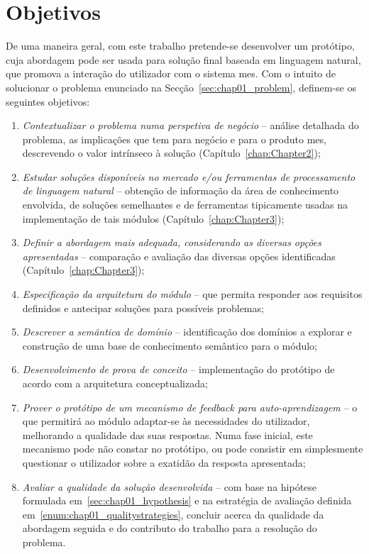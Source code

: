 \section{Objetivos}
\label{sec:chap01_objectives}
De uma maneira geral, com este trabalho pretende-se desenvolver um protótipo, cuja abordagem pode ser usada para solução final baseada em linguagem natural, que promova a interação do utilizador com o sistema \gls{mes}. Com o intuito de solucionar o problema enunciado na Secção~\ref{sec:chap01_problem}, definem-se os seguintes objetivos:

\begin{enumerate}
    \item
    {
        \textit{Contextualizar o problema numa perspetiva de negócio} -- análise detalhada do problema, as implicações que tem para negócio e para o produto \gls{mes}, descrevendo o valor intrínseco à solução (Capítulo~\ref{chap:Chapter2});
    }
    \item
    {
        \textit{Estudar soluções disponíveis no mercado e/ou ferramentas de processamento de linguagem natural} -- obtenção de informação da área de conhecimento envolvida, de soluções semelhantes e de ferramentas tipicamente usadas na implementação de tais módulos (Capítulo~\ref{chap:Chapter3});
    }
    \item
    {
        \textit{Definir a abordagem mais adequada, considerando as diversas opções apresentadas} -- comparação e avaliação das diversas opções identificadas (Capítulo~\ref{chap:Chapter3});
    }
    \item
    {
        \textit{Especificação da arquitetura do módulo} -- que permita responder aos requisitos definidos e antecipar soluções para possíveis problemas;
    }
    \item
    {
        \textit{Descrever a semântica de domínio} -- identificação dos domínios a explorar e construção de uma base de conhecimento semântico para o módulo;
    }
    \item
    {
        \textit{Desenvolvimento de prova de conceito} -- implementação do protótipo de acordo com a arquitetura conceptualizada;
    }
    \item
    {
        \textit{Prover o protótipo de um mecanismo de feedback para auto-aprendizagem} -- o que permitirá ao módulo adaptar-se às necessidades do utilizador, melhorando a qualidade das suas respostas. Numa fase inicial, este mecanismo pode não constar no protótipo, ou pode consistir em simplesmente questionar o utilizador sobre a exatidão da resposta apresentada;
    }
    \item
    {
        \textit{Avaliar a qualidade da solução desenvolvida} -- com base na hipótese formulada em~\ref{sec:chap01_hypothesis} e na estratégia de avaliação definida em~\ref{enum:chap01_qualitystrategies}, concluir acerca da qualidade da abordagem seguida e do contributo do trabalho para a resolução do problema.
    }
\end{enumerate}